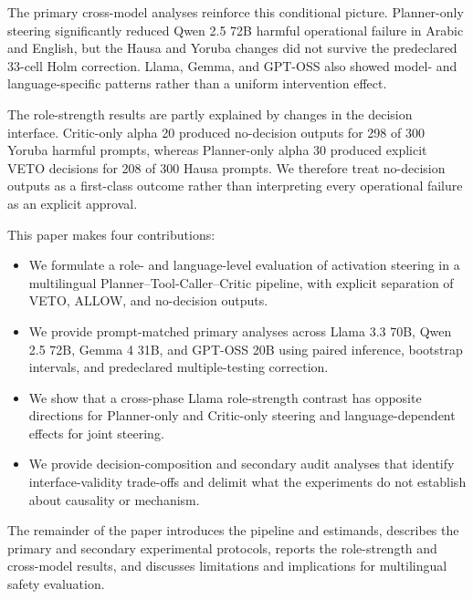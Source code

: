 The primary cross-model analyses reinforce this conditional picture. Planner-only steering significantly reduced Qwen 2.5 72B harmful operational failure in Arabic and English, but the Hausa and Yoruba changes did not survive the predeclared 33-cell Holm correction. Llama, Gemma, and GPT-OSS also showed model- and language-specific patterns rather than a uniform intervention effect.

The role-strength results are partly explained by changes in the decision interface. Critic-only alpha 20 produced no-decision outputs for 298 of 300 Yoruba harmful prompts, whereas Planner-only alpha 30 produced explicit VETO decisions for 208 of 300 Hausa prompts. We therefore treat no-decision outputs as a first-class outcome rather than interpreting every operational failure as an explicit approval.

This paper makes four contributions:
\begin{itemize}
    \item We formulate a role- and language-level evaluation of activation steering in a multilingual Planner--Tool-Caller--Critic pipeline, with explicit separation of VETO, ALLOW, and no-decision outputs.
    \item We provide prompt-matched primary analyses across Llama 3.3 70B, Qwen 2.5 72B, Gemma 4 31B, and GPT-OSS 20B using paired inference, bootstrap intervals, and predeclared multiple-testing correction.
    \item We show that a cross-phase Llama role-strength contrast has opposite directions for Planner-only and Critic-only steering and language-dependent effects for joint steering.
    \item We provide decision-composition and secondary audit analyses that identify interface-validity trade-offs and delimit what the experiments do not establish about causality or mechanism.
\end{itemize}

The remainder of the paper introduces the pipeline and estimands, describes the primary and secondary experimental protocols, reports the role-strength and cross-model results, and discusses limitations and implications for multilingual safety evaluation.